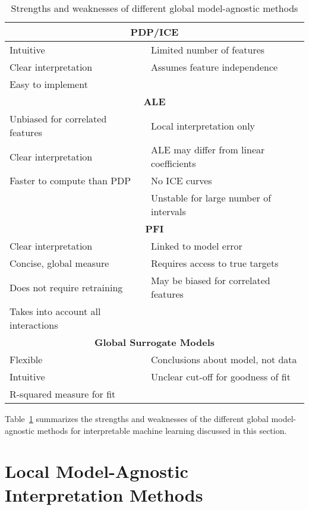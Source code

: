 \begin{table}
\centering
\renewcommand{\arraystretch}{1.1}
\begin{tabular}{l|l} \hline
\multicolumn{2}{c}{\textbf{PDP/ICE}} \\ \hline
Intuitive & Limited number of features \\
Clear interpretation & Assumes feature independence \\
Easy to implement & \\ \hline
\multicolumn{2}{c}{\textbf{ALE}} \\ \hline
Unbiased for correlated features & Local interpretation only\\
Clear interpretation & ALE may differ from linear coefficients\\ 
Faster to compute than PDP & No ICE curves \\
& Unstable for large number of intervals \\  \hline
\multicolumn{2}{c}{\textbf{PFI}} \\ \hline
Clear interpretation & Linked to model error \\
Concise, global measure & Requires access to true targets \\
Does not require retraining & May be biased for correlated features \\
Takes into account all interactions & \\ \hline
\multicolumn{2}{c}{\textbf{Global Surrogate Models}} \\ \hline
Flexible & Conclusions about model, not data \\ 
Intuitive & Unclear cut-off for goodness of fit \\
R-squared measure for fit & \\ \hline
\end{tabular}
\caption[Strengths and weaknesses of global model-agnostic methods]{Strengths and weaknesses of different global model-agnostic methods}
\label{tab:summaryglobalmethods}
\end{table}

Table~\ref{tab:summaryglobalmethods} summarizes the strengths and weaknesses of the different global model-agnostic methods for interpretable machine learning discussed in this section.

\section{Local Model-Agnostic Interpretation Methods}

